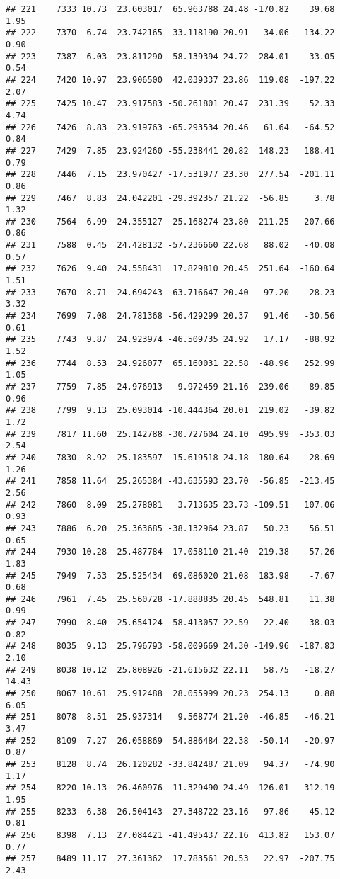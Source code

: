 \documentclass[]{article}
\begin{document}
\begin{verbatim}
## 221    7333 10.73  23.603017  65.963788 24.48 -170.82    39.68  1.95
## 222    7370  6.74  23.742165  33.118190 20.91  -34.06  -134.22  0.90
## 223    7387  6.03  23.811290 -58.139394 24.72  284.01   -33.05  0.54
## 224    7420 10.97  23.906500  42.039337 23.86  119.08  -197.22  2.07
## 225    7425 10.47  23.917583 -50.261801 20.47  231.39    52.33  4.74
## 226    7426  8.83  23.919763 -65.293534 20.46   61.64   -64.52  0.84
## 227    7429  7.85  23.924260 -55.238441 20.82  148.23   188.41  0.79
## 228    7446  7.15  23.970427 -17.531977 23.30  277.54  -201.11  0.86
## 229    7467  8.83  24.042201 -29.392357 21.22  -56.85     3.78  1.32
## 230    7564  6.99  24.355127  25.168274 23.80 -211.25  -207.66  0.86
## 231    7588  0.45  24.428132 -57.236660 22.68   88.02   -40.08  0.57
## 232    7626  9.40  24.558431  17.829810 20.45  251.64  -160.64  1.51
## 233    7670  8.71  24.694243  63.716647 20.40   97.20    28.23  3.32
## 234    7699  7.08  24.781368 -56.429299 20.37   91.46   -30.56  0.61
## 235    7743  9.87  24.923974 -46.509735 24.92   17.17   -88.92  1.52
## 236    7744  8.53  24.926077  65.160031 22.58  -48.96   252.99  1.05
## 237    7759  7.85  24.976913  -9.972459 21.16  239.06    89.85  0.96
## 238    7799  9.13  25.093014 -10.444364 20.01  219.02   -39.82  1.72
## 239    7817 11.60  25.142788 -30.727604 24.10  495.99  -353.03  2.54
## 240    7830  8.92  25.183597  15.619518 24.18  180.64   -28.69  1.26
## 241    7858 11.64  25.265384 -43.635593 23.70  -56.85  -213.45  2.56
## 242    7860  8.09  25.278081   3.713635 23.73 -109.51   107.06  0.93
## 243    7886  6.20  25.363685 -38.132964 23.87   50.23    56.51  0.65
## 244    7930 10.28  25.487784  17.058110 21.40 -219.38   -57.26  1.83
## 245    7949  7.53  25.525434  69.086020 21.08  183.98    -7.67  0.68
## 246    7961  7.45  25.560728 -17.888835 20.45  548.81    11.38  0.99
## 247    7990  8.40  25.654124 -58.413057 22.59   22.40   -38.03  0.82
## 248    8035  9.13  25.796793 -58.009669 24.30 -149.96  -187.83  2.10
## 249    8038 10.12  25.808926 -21.615632 22.11   58.75   -18.27 14.43
## 250    8067 10.61  25.912488  28.055999 20.23  254.13     0.88  6.05
## 251    8078  8.51  25.937314   9.568774 21.20  -46.85   -46.21  3.47
## 252    8109  7.27  26.058869  54.886484 22.38  -50.14   -20.97  0.87
## 253    8128  8.74  26.120282 -33.842487 21.09   94.37   -74.90  1.17
## 254    8220 10.13  26.460976 -11.329490 24.49  126.01  -312.19  1.95
## 255    8233  6.38  26.504143 -27.348722 23.16   97.86   -45.12  0.81
## 256    8398  7.13  27.084421 -41.495437 22.16  413.82   153.07  0.77
## 257    8489 11.17  27.361362  17.783561 20.53   22.97  -207.75  2.43

\end{verbatim}
\end{document}
